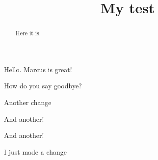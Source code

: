 \documentclass{ximera}
\title{My test}
\begin{document}
\begin{abstract}
  Here it is.
\end{abstract}
\maketitle

Hello. Marcus is great!






\begin{multipleChoice}
  How do you say goodbye?
\end{multipleChoice}

Another change

And another!

And another!

I just made a change
\end{document}
